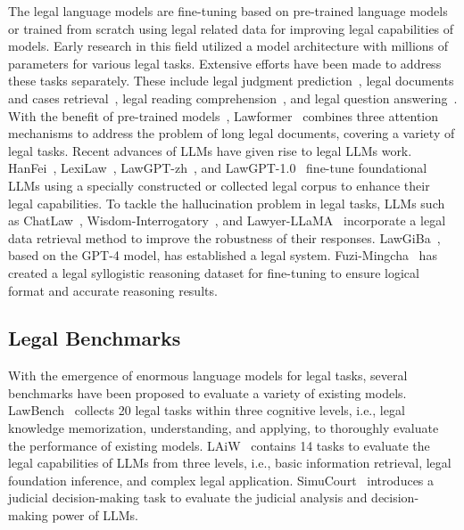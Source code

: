 The legal language models are fine-tuning based on pre-trained language models or trained from scratch using legal related data for improving legal capabilities of models. 
Early research in this field utilized a model architecture with millions of parameters for various legal tasks. 
Extensive efforts have been made to address these tasks separately. These include legal judgment prediction~\citep{luo2017legalpredict, chalkidis19legalpredict, yang2019legalpredict}, legal documents and cases retrieval~\citep{chen2013textmining, shao2020bertpli, li2023SAILER}, legal reading comprehension~\citep{duan2019cjrc}, and legal question answering~\citep{zhong2020nlpbenefit, phi2020legalqa}. 
With the benefit of pre-trained models~\citep{chalkidis2020legalbert, cui21roberta}, Lawformer~\citep{xiao21lawformer} combines three attention mechanisms to address the problem of long legal documents, covering a variety of legal tasks. 
Recent advances of LLMs have given rise to legal LLMs work. 
HanFei~\citep{zhang2023HanFei}, LexiLaw~\citep{li2023SAILER}, LawGPT-zh~\citep{liu2023lawgptzh}, and LawGPT-1.0~\citep{nguyen2023LawGPT}  fine-tune foundational LLMs using a specially constructed or collected legal corpus to enhance their legal capabilities. 
To tackle the hallucination problem in legal tasks, LLMs such as ChatLaw~\citep{cui23chatlaw}, Wisdom-Interrogatory~\citep{wu2024WisdomInterrogatory}, and Lawyer-LLaMA~\citep{huang2023LawyerLLaMA} incorporate a legal data retrieval method to improve the robustness of their responses.
LawGiBa~\citep{nguyen2023LawGiBa}, based on the GPT-4 model, has established a legal system.
Fuzi-Mingcha~\citep{deng2023fuzi} has created a legal syllogistic reasoning dataset for fine-tuning to ensure logical format and accurate reasoning results.

\subsection{Legal Benchmarks}

With the emergence of enormous language models for legal tasks, several benchmarks have been proposed to evaluate a variety of existing models.
LawBench~\citep{li2023LawBench} collects 20 legal tasks within three cognitive levels, i.e., legal knowledge memorization, understanding, and applying, to thoroughly evaluate the performance of existing models. LAiW~\citep{dai2023LAiw} contains 14 tasks to evaluate the legal capabilities of LLMs from three levels, i.e., basic information retrieval, legal foundation inference, and complex legal application.
SimuCourt~\citep{he2024simucourt} introduces a judicial decision-making task to evaluate the judicial analysis and decision-making power of LLMs.

